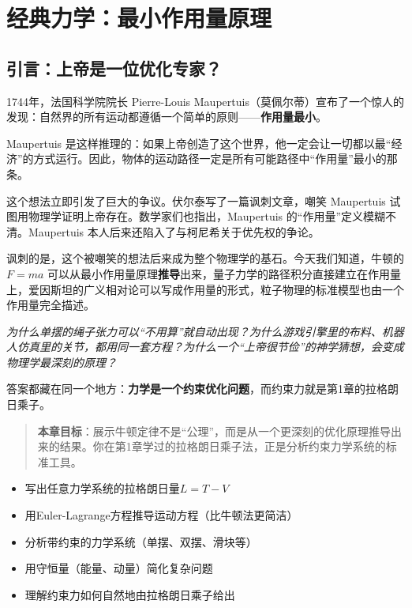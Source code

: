 \chapter{经典力学：最小作用量原理}

\section*{引言：上帝是一位优化专家？}

1744年，法国科学院院长 Pierre-Louis Maupertuis（莫佩尔蒂）宣布了一个惊人的发现：自然界的所有运动都遵循一个简单的原则——\textbf{作用量最小}。

Maupertuis 是这样推理的：如果上帝创造了这个世界，他一定会让一切都以最“经济”的方式运行。因此，物体的运动路径一定是所有可能路径中“作用量”最小的那条。

这个想法立即引发了巨大的争议。伏尔泰写了一篇讽刺文章，嘲笑 Maupertuis 试图用物理学证明上帝存在。数学家们也指出，Maupertuis 的“作用量”定义模糊不清。Maupertuis 本人后来还陷入了与柯尼希关于优先权的争论。

讽刺的是，这个被嘲笑的想法后来成为整个物理学的基石。今天我们知道，牛顿的 $F = ma$ 可以从最小作用量原理\textbf{推导}出来，量子力学的路径积分直接建立在作用量上，爱因斯坦的广义相对论可以写成作用量的形式，粒子物理的标准模型也由一个作用量完全描述。

\vspace{0.3cm}
\noindent\textit{为什么单摆的绳子张力可以“不用算”就自动出现？为什么游戏引擎里的布料、机器人仿真里的关节，都用同一套方程？为什么一个“上帝很节俭”的神学猜想，会变成物理学最深刻的原理？}

\vspace{0.3cm}
答案都藏在同一个地方：\textbf{力学是一个约束优化问题}，而约束力就是第1章的拉格朗日乘子。

\begin{quote}
\textbf{本章目标}：展示牛顿定律不是“公理”，而是从一个更深刻的优化原理推导出来的结果。你在第1章学过的拉格朗日乘子法，正是分析约束力学系统的标准工具。
\end{quote}

\begin{tcolorbox}[colback=green!5, colframe=green!60!black, title=学完这章，你将能够...]
\begin{itemize}
    \item 写出任意力学系统的拉格朗日量$L = T - V$
    \item 用Euler-Lagrange方程推导运动方程（比牛顿法更简洁）
    \item 分析带约束的力学系统（单摆、双摆、滑块等）
    \item 用守恒量（能量、动量）简化复杂问题
    \item 理解约束力如何自然地由拉格朗日乘子给出
\end{itemize}
\end{tcolorbox}

